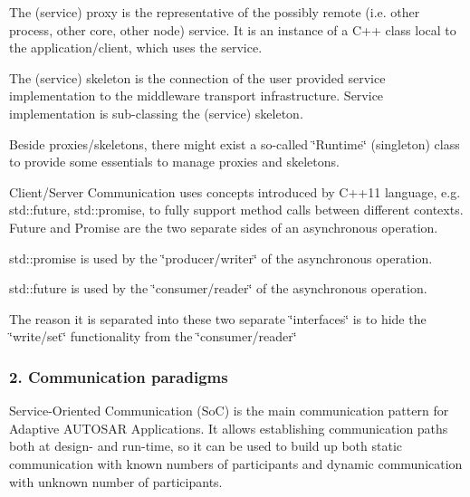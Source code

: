 \begin{DoxyItemize}
\item The (service) proxy is the representative of the possibly remote (i.\+e. other process, other core, other node) service. It is an instance of a C++ class local to the application/client, which uses the service.
\item The (service) skeleton is the connection of the user provided service implementation to the middleware transport infrastructure. Service implementation is sub-\/classing the (service) skeleton.
\item Beside proxies/skeletons, there might exist a so-\/called \char`\"{}\+Runtime\char`\"{} (singleton) class to provide some essentials to manage proxies and skeletons.
\item Client/\+Server Communication uses concepts introduced by C++11 language, e.\+g. std\+::future, std\+::promise, to fully support method calls between different contexts. Future and Promise are the two separate sides of an asynchronous operation.
\begin{DoxyItemize}
\item std\+::promise is used by the \char`\"{}producer/writer\char`\"{} of the asynchronous operation.
\item std\+::future is used by the \char`\"{}consumer/reader\char`\"{} of the asynchronous operation.
\item The reason it is separated into these two separate \char`\"{}interfaces\char`\"{} is to hide the \char`\"{}write/set\char`\"{} functionality from the \char`\"{}consumer/reader\char`\"{}
\end{DoxyItemize}
\end{DoxyItemize}

\subsubsection*{2. Communication paradigms}

Service-\/\+Oriented Communication (SoC) is the main communication pattern for Adaptive A\+U\+T\+O\+S\+AR Applications. It allows establishing communication paths both at design-\/ and run-\/time, so it can be used to build up both static communication with known numbers of participants and dynamic communication with unknown number of participants.

